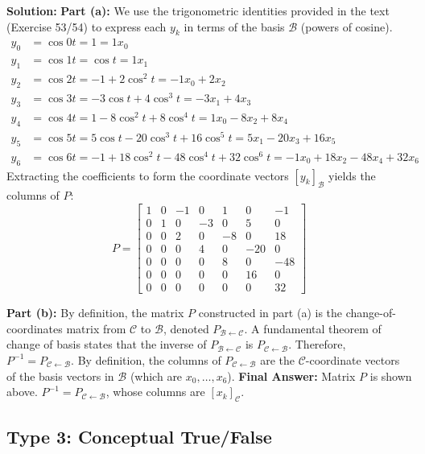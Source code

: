 \documentclass[11pt]{article}
\begin{document}
\textbf{Solution:}
\textbf{Part (a):} We use the trigonometric identities provided in the text (Exercise 53/54) to express each $y_k$ in terms of the basis $\mathcal{B}$ (powers of cosine).
\begin{align*}
y_0 &= \cos 0t = 1 = 1x_0 \\
y_1 &= \cos 1t = \cos t = 1x_1 \\
y_2 &= \cos 2t = -1 + 2\cos^2 t = -1x_0 + 2x_2 \\
y_3 &= \cos 3t = -3\cos t + 4\cos^3 t = -3x_1 + 4x_3 \\
y_4 &= \cos 4t = 1 - 8\cos^2 t + 8\cos^4 t = 1x_0 - 8x_2 + 8x_4 \\
y_5 &= \cos 5t = 5\cos t - 20\cos^3 t + 16\cos^5 t = 5x_1 - 20x_3 + 16x_5 \\
y_6 &= \cos 6t = -1 + 18\cos^2 t - 48\cos^4 t + 32\cos^6 t = -1x_0 + 18x_2 - 48x_4 + 32x_6
\end{align*}
Extracting the coefficients to form the coordinate vectors $[y_k]_{\mathcal{B}}$ yields the columns of $P$:
\[ P = \begin{bmatrix} 
1 & 0 & -1 & 0 & 1 & 0 & -1 \\
0 & 1 & 0 & -3 & 0 & 5 & 0 \\
0 & 0 & 2 & 0 & -8 & 0 & 18 \\
0 & 0 & 0 & 4 & 0 & -20 & 0 \\
0 & 0 & 0 & 0 & 8 & 0 & -48 \\
0 & 0 & 0 & 0 & 0 & 16 & 0 \\
0 & 0 & 0 & 0 & 0 & 0 & 32 
\end{bmatrix} \]

\textbf{Part (b):} By definition, the matrix $P$ constructed in part (a) is the change-of-coordinates matrix from $\mathcal{C}$ to $\mathcal{B}$, denoted $P_{\mathcal{B} \leftarrow \mathcal{C}}$. A fundamental theorem of change of basis states that the inverse of $P_{\mathcal{B} \leftarrow \mathcal{C}}$ is $P_{\mathcal{C} \leftarrow \mathcal{B}}$. Therefore, $P^{-1} = P_{\mathcal{C} \leftarrow \mathcal{B}}$. By definition, the columns of $P_{\mathcal{C} \leftarrow \mathcal{B}}$ are the $\mathcal{C}$-coordinate vectors of the basis vectors in $\mathcal{B}$ (which are $x_0, \dots, x_6$).
\textbf{Final Answer:} Matrix $P$ is shown above. $P^{-1} = P_{\mathcal{C} \leftarrow \mathcal{B}}$, whose columns are $[x_k]_{\mathcal{C}}$.

\subsection{Type 3: Conceptual True/False}
\end{document}
